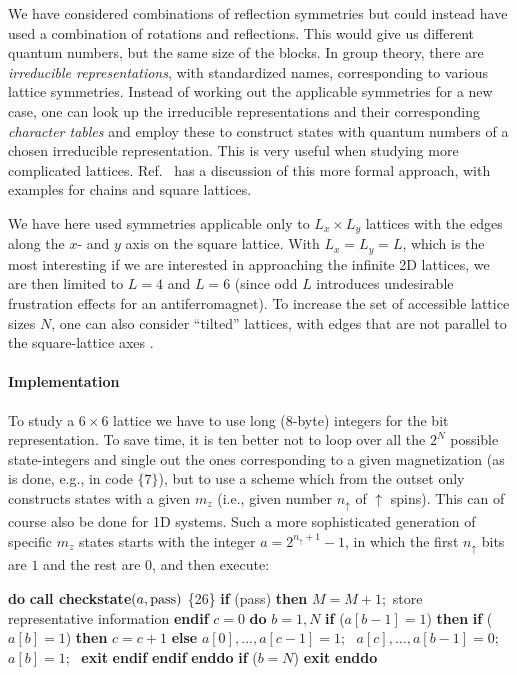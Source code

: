 \documentclass[draft,numberedheadings]{aipproc}
\newcommand{\up}{\uparrow}
\newcommand{\code}{\null\vskip-2mm\noindent}
\newcommand{\br}{\hfill\break}
\newcommand{\cia}{\null\hskip5mm}
\newcommand{\cib}{\null\hskip10mm}
\newcommand{\cic}{\null\hskip15mm}
\newcommand{\cid}{\null\hskip20mm}
\newcommand{\cie}{\null\hskip25mm}
\begin{document}
We have considered combinations of reflection symmetries but could instead have used a combination of rotations and reflections. 
This would give us different quantum numbers, but the same size of the blocks. In group theory, there are {\it irreducible representations}, with 
standardized names, corresponding to various lattice symmetries. Instead of working out the applicable symmetries for a new case, one can look up 
the irreducible representations and their corresponding {\it character tables} and employ these to construct states with quantum numbers 
of a chosen irreducible representation. This is very useful when studying more complicated lattices. Ref.~\cite{didier} has a 
discussion of this more formal approach, with examples for chains and square lattices.

We have here used symmetries applicable only to $L_x\times L_y$ lattices with the edges along the $x$- and $y$ axis on the square lattice. With 
$L_x=L_y=L$, which is the most interesting if we are interested in approaching the infinite 2D lattices, we are then limited to $L=4$ and $L=6$ (since 
odd $L$ introduces undesirable frustration effects for an antiferromagnet). To increase the set of accessible lattice sizes $N$, one can also consider 
``tilted'' lattices, with edges that are not parallel to the square-lattice axes \cite{didier}.

\paragraph{Implementation}

To study a $6\times 6$ lattice we have to use long (8-byte) integers for the bit representation. To save time, it is ten better not to loop over all 
the $2^N$ possible state-integers and single out the ones corresponding to a given magnetization (as is done, e.g., in code $\{7\}$), but to use a scheme 
which from the outset only constructs states with a given $m_z$ (i.e., given number $n_\up$ of $\up$ spins). This can of course also be done for 1D 
systems. Such a more sophisticated generation of specific $m_z$ states starts with the integer $a=2^{n_\uparrow+1}-1$, in which the first $n_\up$ bits 
are $1$ and the rest are $0$, and then execute: 

{\code
\cia {\bf do} \br
\cib     {\bf call checkstate}$(a,{\rm pass})$ \hfill \{26\}\break
\cib     {\bf if} (pass) {\bf then} $M=M+1$;~{\rm store representative information} {\bf endif} \br
\cib     $c=0$ \br
\cib     {\bf do} $b=1,N$ \br
\cic         {\bf if} ($a[b-1]=1$) {\bf then} \br
\cid             {\bf if} ($a[b]=1$) {\bf then} \br
\cie                  $c=c+1$ \br
\cid             {\bf else} \br
\cie                  $a[0],\ldots,a[c-1]=1$;~ $a[c],\ldots,a[b-1]=0$;~ $a[b]=1$;~ {\bf exit} \br
\cid            {\bf endif} \br
\cic         {\bf endif} \br
\cib      {\bf enddo} \br
\cib      {\bf if} ($b=N$) {\bf exit} \br
\cia      {\bf enddo} 
\code}
\end{document}
